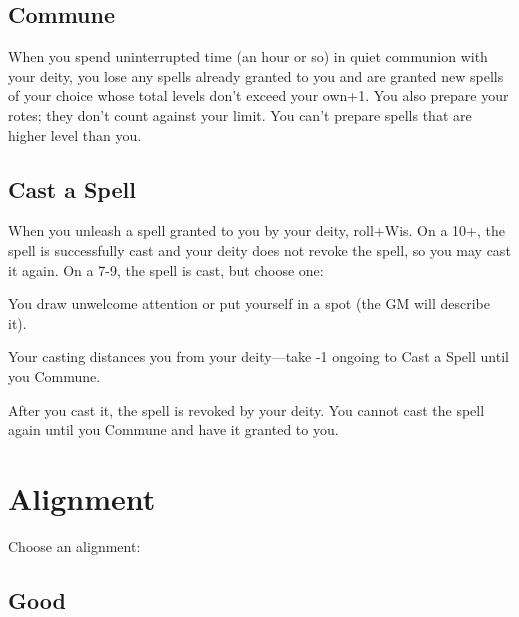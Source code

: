  


\subsection{Commune}   
 

When you spend uninterrupted time (an hour or so) in quiet communion with your deity, you lose any spells already granted to you and are granted new spells of your choice whose total levels don't exceed your own+1. You also prepare your rotes; they don't count against your limit. You can't prepare spells that are higher level than you.



 


\subsection{Cast a Spell}    
 

When you unleash a spell granted to you by your deity, roll+Wis. On a 10+, the spell is successfully cast and your deity does not revoke the spell, so you may cast it again. On a 7-9, the spell is cast, but choose one:

 
\startitemize[1,packed]

\item You draw unwelcome attention or put yourself in a spot (the GM will describe it).

 
\item Your casting distances you from your deity—take -1 ongoing to Cast a Spell until you Commune.

 
\item After you cast it, the spell is revoked by your deity. You cannot cast the spell again until you Commune and have it granted to you.


\stopitemize






 
\section{Alignment}   
 
\startInstructionsAfterHeader
Choose an alignment:
\stopInstructionsAfterHeader
 


\subsection{Good}   
 


